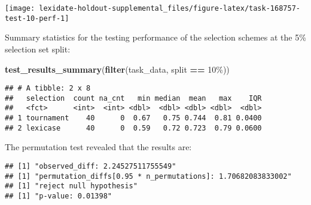 \documentclass[
]{book}
\newenvironment{Shaded}{\begin{snugshade}}{\end{snugshade}}
\newcommand{\AttributeTok}[1]{\textcolor[rgb]{0.13,0.29,0.53}{#1}}
\newcommand{\DecValTok}[1]{\textcolor[rgb]{0.00,0.00,0.81}{#1}}
\newcommand{\FunctionTok}[1]{\textcolor[rgb]{0.13,0.29,0.53}{\textbf{#1}}}
\newcommand{\NormalTok}[1]{#1}
\newcommand{\OtherTok}[1]{\textcolor[rgb]{0.56,0.35,0.01}{#1}}
\newcommand{\SpecialCharTok}[1]{\textcolor[rgb]{0.81,0.36,0.00}{\textbf{#1}}}
\newcommand{\StringTok}[1]{\textcolor[rgb]{0.31,0.60,0.02}{#1}}
\begin{document}
\texttt{[image: lexidate-holdout-supplemental\_files/figure-latex/task-168757-test-10-perf-1]}

Summary statistics for the testing performance of the selection schemes at the 5\% selection set split:

\begin{Shaded}
\begin{Highlighting}[]
\FunctionTok{test\_results\_summary}\NormalTok{(}\FunctionTok{filter}\NormalTok{(task\_data, split }\SpecialCharTok{==} \StringTok{\textquotesingle{}10\%\textquotesingle{}}\NormalTok{))}
\end{Highlighting}
\end{Shaded}

\begin{verbatim}
## # A tibble: 2 x 8
##   selection  count na_cnt   min median  mean   max    IQR
##   <fct>      <int>  <int> <dbl>  <dbl> <dbl> <dbl>  <dbl>
## 1 tournament    40      0  0.67   0.75 0.744  0.81 0.0400
## 2 lexicase      40      0  0.59   0.72 0.723  0.79 0.0600
\end{verbatim}

The permutation test revealed that the results are:

\begin{Shaded}
\end{Shaded}

\begin{verbatim}
## [1] "observed_diff: 2.24527511755549"
## [1] "permutation_diffs[0.95 * n_permutations]: 1.70682083833002"
## [1] "reject null hypothesis"
## [1] "p-value: 0.01398"
\end{verbatim}
\end{document}
